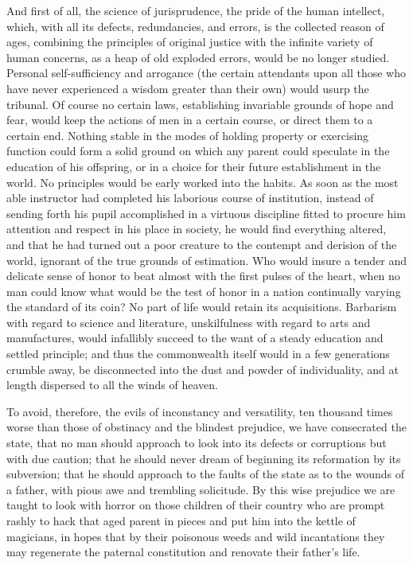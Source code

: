 And first of all, the science of jurisprudence, the pride of the human intellect, which, with all its defects, redundancies, and errors, is the collected reason of ages, combining the principles of original justice with the infinite variety of human concerns, as a heap of old exploded errors, would be no longer studied. Personal self-sufficiency and arrogance (the certain attendants upon all those who have never experienced a wisdom greater than their own) would usurp the tribunal. Of course no certain laws, establishing invariable grounds of hope and fear, would keep the actions of men in a certain course, or direct them to a certain end. Nothing stable in the modes of holding property or exercising function could form a solid ground on which any parent could speculate in the education of his offspring, or in a choice for their future establishment in the world. No principles would be early worked into the habits. As soon as the most able instructor had completed his laborious course of institution, instead of sending forth his pupil accomplished in a virtuous discipline fitted to procure him attention and respect in his place in society, he would find everything altered, and that he had turned out a poor creature to the contempt and derision of the world, ignorant of the true grounds of estimation. Who would insure a tender and delicate sense of honor to beat almost with the first pulses of the heart, when no man could know what would be the test of honor in a nation continually varying the standard of its coin? No part of life would retain its acquisitions. Barbarism with regard to science and literature, unskilfulness with regard to arts and manufactures, would infallibly succeed to the want of a steady education and settled principle; and thus the commonwealth itself would in a few generations crumble away, be disconnected into the dust and powder of individuality, and at length dispersed to all the winds of heaven.

To avoid, therefore, the evils of inconstancy and versatility, ten thousand times worse than those of obstinacy and the blindest prejudice, we have consecrated the state, that no man should approach to look into its defects or corruptions but with due caution; that he should never dream of beginning its reformation by its subversion; that he should approach to the faults of the state as to the wounds of a father, with pious awe and trembling solicitude. By this wise prejudice we are taught to look with horror on those children of their country who are prompt rashly to hack that aged parent in pieces and put him into the kettle of magicians, in hopes that by their poisonous weeds and wild incantations they may regenerate the paternal constitution and renovate their father's life.

